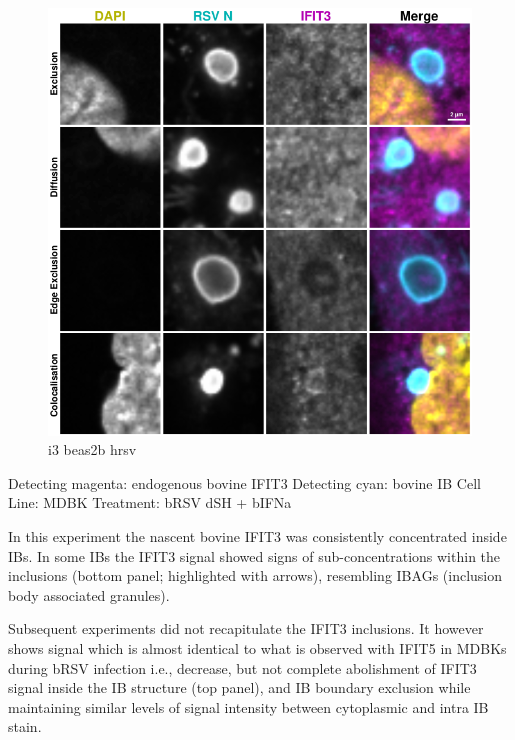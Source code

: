 \begin{figure}
    \centering
    \includegraphics[width=1\linewidth]{09. Chapter 4/Figs/02. Infection/02. IFIT3/06. beas2b i3.pdf}
    \caption[i3 beas2b hrsv]{i3 beas2b hrsv}
    \label{fig:i3 beas2b hrsv}
\end{figure}

Detecting magenta: endogenous bovine IFIT3 \newline
Detecting cyan: bovine IB \newline
Cell Line: MDBK \newline
Treatment: bRSV dSH + bIFNa \newline

In this experiment the nascent bovine IFIT3 was consistently concentrated inside IBs. In some IBs the IFIT3 signal showed signs of sub-concentrations within the inclusions (bottom panel; highlighted with arrows), resembling IBAGs (inclusion body associated granules).

Subsequent experiments did not recapitulate the IFIT3 inclusions. It however shows signal which is almost identical to what is observed with IFIT5 in MDBKs during bRSV infection i.e., decrease, but not complete abolishment of IFIT3 signal inside the IB structure (top panel), and IB boundary exclusion while maintaining similar levels of signal intensity between cytoplasmic and intra IB stain.


